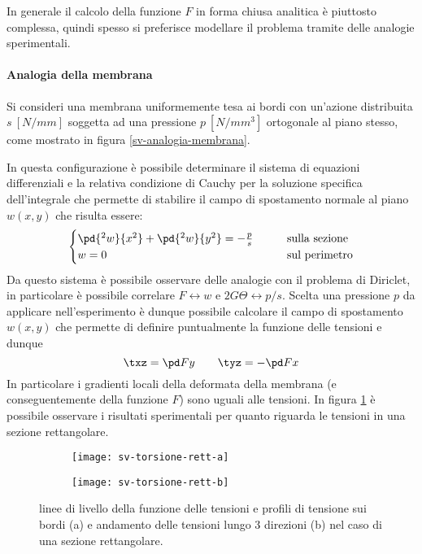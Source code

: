     		In generale il calcolo della funzione $F$ in forma chiusa analitica è piuttosto complessa, quindi spesso si preferisce modellare il problema tramite delle analogie sperimentali.
    		
    		\paragraph{Analogia della membrana} Si consideri una membrana uniformemente tesa ai bordi con un'azione distribuita $s\ [N/mm]$ soggetta ad una pressione $p \ [N/mm^3]$ ortogonale al piano stesso, come mostrato in figura \ref{sv-analogia-membrana}.
    		
    		
    		In questa configurazione è possibile determinare il sistema di equazioni differenziali e la relativa condizione di Cauchy per la soluzione specifica dell'integrale che permette di stabilire il campo di spostamento normale al piano $w(x,y)$ che risulta essere:
    		\[ \begin{cases}
    			\pd {^2w}{x^2} + \pd{^2w}{y^2} = -\frac p s \qquad & \textrm{sulla sezione} \\
    			w = 0 \qquad & \textrm{sul perimetro} \\
    		\end{cases} \]
    		Da questo sistema è possibile osservare delle analogie con il problema di Diriclet, in particolare è possibile correlare $F \leftrightarrow w$ e $2G\Theta\leftrightarrow p/s$. Scelta una pressione $p$ da applicare nell'esperimento è dunque possibile calcolare il campo di spostamento $w(x,y)$ che permette di definire puntualmente la funzione delle tensioni e dunque
    		\[ \txz = \pd F y \qquad \tyz = -\pd F x \]
    		In particolare i gradienti locali della deformata della membrana (e conseguentemente della funzione $F$) sono uguali alle tensioni. In figura \ref{fig:sv:tensione-torsione-rettangolo} è possibile osservare i risultati sperimentali per quanto riguarda le tensioni in una sezione rettangolare.
    		
    		\begin{figure}
    		\centering
    		\begin{subfigure}{0.48\linewidth}
    			\centering
    			\texttt{[image: sv-torsione-rett-a]} \caption{}
    		\end{subfigure}
	    	\begin{subfigure}{0.48\linewidth}
		    	\centering
		    	\texttt{[image: sv-torsione-rett-b]} \caption{}
		    \end{subfigure}
	    	\caption{linee di livello della funzione delle tensioni e profili di tensione sui bordi (a) e andamento delle tensioni lungo 3 direzioni (b) nel caso di una sezione rettangolare.}
	    	\label{fig:sv:tensione-torsione-rettangolo}
    		\end{figure}
    	

